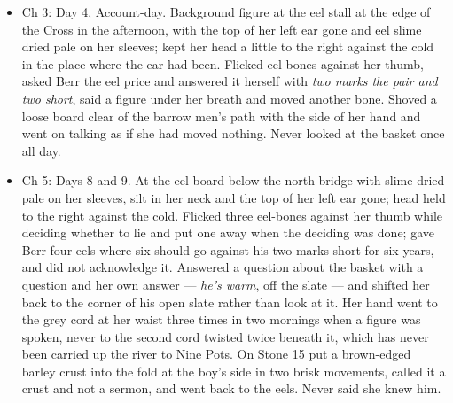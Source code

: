 \documentclass{design/chronicle}
\begin{document}
{\begin{itemize}[leftmargin=1.4em,itemsep=1pt,topsep=3pt,parsep=0pt]
\item Ch 3: Day 4, Account-day. Background figure at the eel stall at the edge of the Cross in the afternoon, with the top of her left ear gone and eel slime dried pale on her sleeves; kept her head a little to the right against the cold in the place where the ear had been. Flicked eel-bones against her thumb, asked Berr the eel price and answered it herself with \emph{two marks the pair and two short}, said a figure under her breath and moved another bone. Shoved a loose board clear of the barrow men’s path with the side of her hand and went on talking as if she had moved nothing. Never looked at the basket once all day.

\end{itemize}

\begin{itemize}[leftmargin=1.4em,itemsep=1pt,topsep=3pt,parsep=0pt]

\item Ch 5: Days 8 and 9. At the eel board below the north bridge with slime dried pale on her sleeves, silt in her neck and the top of her left ear gone; head held to the right against the cold. Flicked three eel-bones against her thumb while deciding whether to lie and put one away when the deciding was done; gave Berr four eels where six should go against his two marks short for six years, and did not acknowledge it. Answered a question about the basket with a question and her own answer --- \emph{he’s warm}, off the slate --- and shifted her back to the corner of his open slate rather than look at it. Her hand went to the grey cord at her waist three times in two mornings when a figure was spoken, never to the second cord twisted twice beneath it, which has never been carried up the river to Nine Pots. On Stone 15 put a brown-edged barley crust into the fold at the boy’s side in two brisk movements, called it a crust and not a sermon, and went back to the eels. Never said she knew him.

\end{itemize}

\begin{itemize}[leftmargin=1.4em,itemsep=1pt,topsep=3pt,parsep=0pt]


\end{itemize}}
\end{document}
